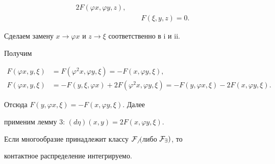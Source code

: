 \begin{pf}
\begin{align*}
2F(\varphi x,\varphi y,z),\\ 


&\phantom{.}\quad F(\xi,y,z)=0. 


\end{align*} 


Сделаем замену $x\to\varphi x$ и $z\to\xi$ соответственно в i и ii. 


Получим 


\begin{align*} 


F(\varphi x,y,\xi)&=F(\varphi ^2x,\varphi y,\xi)= 


-F(x,\varphi y,\xi),\\ 


F(\varphi x,y,\xi)&=-F(y,\xi,\varphi x)+ 


2F(\varphi ^2x,\varphi y,\xi)=-F(y,\varphi x,\xi)-2F(x,\varphi y,\xi). 


\end{align*} 


Отсюда $F(y,\varphi x,\xi)=-F(x,\varphi y,\xi)$. Далее 


применим лемму 3: $(d\eta)(x,y)=2F(x,\varphi y,\xi)$. 


\end{pf} 


 


\begin{thm} 


Если многообразие принадлежит классу $\cal F_6$ $($либо $\cal F_9)$, то 


контактное распределение интегрируемо. 


\end{thm} 


 


